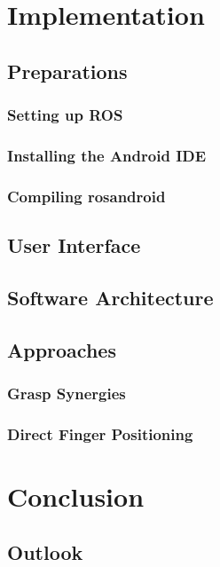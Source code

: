 \documentclass[11pt,DIV=15,BCOR=20mm,bibliography=totoc]{scrbook}
\begin{document}
\chapter{Implementation}
\section{Preparations}
\subsection{Setting up ROS}
\subsection{Installing the Android IDE}
\subsection{Compiling rosandroid}

\section{User Interface}

\section{Software Architecture}

\section{Approaches}

\subsection{Grasp Synergies}

\subsection{Direct Finger Positioning}

\chapter{Conclusion}

\section{Outlook}

\cleardoublepage




\cleardoublepage


    
\end{document}
